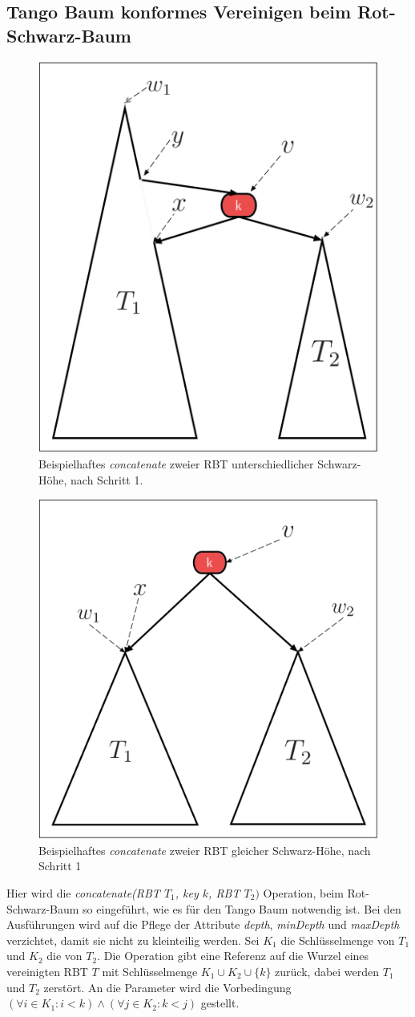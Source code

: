 \documentclass[a4paper,12pt]{article}
\begin{document}
\subsection{Tango Baum konformes Vereinigen beim Rot-Schwarz-Baum} \label{vereinigen}
\begin{figure}[H]
	\centering
	\includegraphics[height= 0.6\textwidth]{"Medien/RotSchwarzBaum/vereinigen"}
	\caption{Beispielhaftes \textit{concatenate} zweier RBT unterschiedlicher Schwarz-Höhe, nach Schritt 1. }
	\label{fig:vereinigen}
\end{figure}
\begin{figure}[H]
	\centering
	\includegraphics[height= 0.6\textwidth]{"Medien/RotSchwarzBaum/vereinigen2"}
	\caption{Beispielhaftes \textit{concatenate} zweier RBT gleicher Schwarz-Höhe, nach Schritt 1 }
	\label{fig:vereinigen2}
\end{figure}
\noindent Hier wird die \textit{concatenate(RBT $T_1$, key $k$, RBT $T_2)$} Operation, beim Rot-Schwarz-Baum so eingeführt, wie es für den Tango Baum notwendig ist. Bei den Ausführungen wird auf die Pflege der Attribute \textit{depth}, \textit{minDepth} und \textit{maxDepth} verzichtet, damit sie nicht zu kleinteilig werden. Sei $K_1$ die Schlüsselmenge von $T_1$ und $K_2$ die von $T_2$. Die Operation gibt eine Referenz auf die Wurzel eines vereinigten RBT $T$ mit Schlüsselmenge $K_1 \cup K_2 \cup \{k\} $ zurück, dabei werden $T_1$ und $T_2$ zerstört. An die Parameter wird die Vorbedingung $(\forall i \in K_1: i < k ) \land (\forall j \in K_2: k < j )$ gestellt.\\
\end{document}
